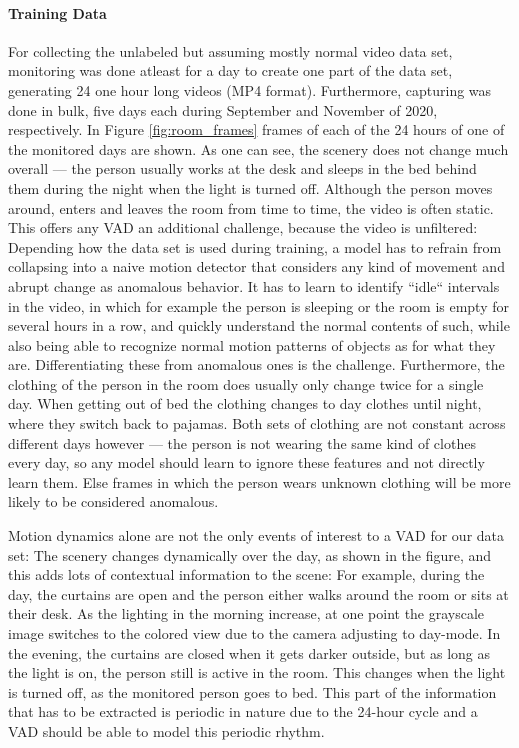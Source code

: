 \paragraph{Training Data}
For collecting the unlabeled but assuming mostly normal video data set, monitoring was done atleast for a day to create one part of the data set, generating 24 one hour long videos (MP4 format). Furthermore, capturing was done in bulk, five days each during September and November of 2020, respectively. In Figure \ref{fig:room_frames} frames of each of the 24 hours of one of the monitored days are shown. As one can see, the scenery does not change much overall --- the person usually works at the desk and sleeps in the bed behind them during the night when the light is turned off. Although the person moves around, enters and leaves the room from time to time, the video is often static. This offers any VAD an additional challenge, because the video is unfiltered: Depending how the data set is used during training, a model has to refrain from collapsing into a naive motion detector that considers any kind of movement and abrupt change as anomalous behavior. It has to learn to identify ``idle`` intervals in the video, in which for example the person is sleeping or the room is empty for several hours in a row, and quickly understand the normal contents of such, while also being able to recognize normal motion patterns of objects as for what they are. Differentiating these from anomalous ones is the challenge. Furthermore, the clothing of the person in the room does usually only change twice for a single day. When getting out of bed the clothing changes to day clothes until night, where they switch back to pajamas. Both sets of clothing are not constant across different days however --- the person is not wearing the same kind of clothes every day, so any model should learn to ignore these features and not directly learn them. Else frames in which the person wears unknown clothing will be more likely to be considered anomalous. 

Motion dynamics alone are not the only events of interest to a VAD for our data set: The scenery changes dynamically over the day, as shown in the figure, and this adds lots of contextual information to the scene: For example, during the day, the curtains are open and the person either walks around the room or sits at their desk. As the lighting in the morning increase, at one point the grayscale image switches to the colored view due to the camera adjusting to day-mode. In the evening, the curtains are closed when it gets darker outside, but as long as the light is on, the person still is active in the room. This changes when the light is turned off, as the monitored person goes to bed. This part of the information that has to be extracted is periodic in nature due to the 24-hour cycle and a VAD should be able to model this periodic rhythm. 

